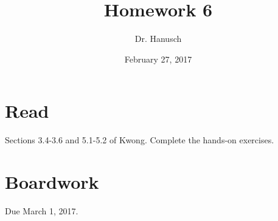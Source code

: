 \documentclass[12pt]{article}
\title{Homework 6}
\author{Dr. Hanusch}  %
\date{February 27, 2017}
\begin{document}
\newtheorem{thm}{Theorem}[section]
\newtheorem{cor}[thm]{Corollary}
\newtheorem{lem}[thm]{Lemma}
\newtheorem{prop}[thm]{Proposition}
\theoremstyle{definition}
\newtheorem{defn}[thm]{Definition}
\newtheorem{qu}[]{Question}
\theoremstyle{remark}
\newtheorem{rem}[thm]{Remark}
\newtheorem*{prf}{Proof}

\newcommand{\norm}[1]{\left\Vert#1\right\Vert}
\newcommand{\abs}[1]{\left\vert#1\right\vert}
\newcommand{\set}[1]{\left\{#1\right\}}
\newcommand{\Real}{\mathbb R}
\newcommand{\Zee}{\mathbb Z}
\newcommand{\eps}{\varepsilon}
\newcommand{\To}{\longrightarrow}
\newcommand{\BX}{\mathbf{B}(X)}
\newcommand{\A}{\mathcal{A}}
\newcommand{\U}{\mathcal{U}}
\newcommand{\power}{\mathscr{P}}




\maketitle

\section{Read}

Sections 3.4-3.6 and 5.1-5.2 of Kwong. Complete the hands-on exercises.

\section{Boardwork} 

Due March 1, 2017.

\end{document}
